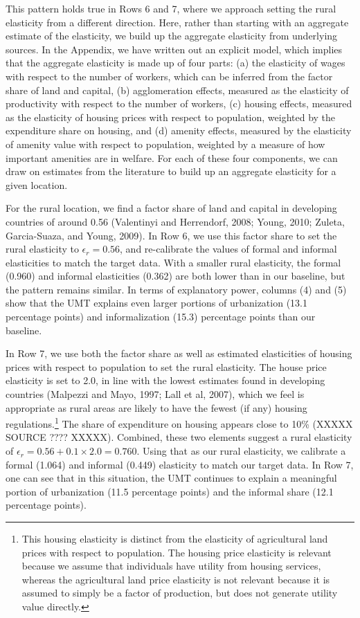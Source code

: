 \documentclass[10pt]{article}
\begin{document}
This pattern holds true in Rows 6 and 7, where we approach setting the rural elasticity from a different direction. Here, rather than starting with an aggregate estimate of the elasticity, we build up the aggregate elasticity from underlying sources. In the Appendix, we have written out an explicit model, which implies that the aggregate elasticity is made up of four parts: (a) the elasticity of wages with respect to the number of workers, which can be inferred from the factor share of land and capital, (b) agglomeration effects, measured as the elasticity of productivity with respect to the number of workers, (c) housing effects, measured as the elasticity of housing prices with respect to population, weighted by the expenditure share on housing, and (d) amenity effects, measured by the elasticity of amenity value with respect to population, weighted by a measure of how important amenities are in welfare. For each of these four components, we can draw on estimates from the literature to build up an aggregate elasticity for a given location.

For the rural location, we find a factor share of land and capital in developing countries of around 0.56 (Valentinyi and Herrendorf, 2008; Young, 2010; Zuleta, Garcia-Suaza, and Young, 2009). In Row 6, we use this factor share to set the rural elasticity to $\epsilon_r = 0.56$, and re-calibrate the values of formal and informal elasticities to match the target data. With a smaller rural elasticity, the formal (0.960) and informal elasticities (0.362) are both lower than in our baseline, but the pattern remains similar. In terms of explanatory power, columns (4) and (5) show that the UMT explains even larger portions of urbanization (13.1 percentage points) and informalization (15.3) percentage points than our baseline. 

In Row 7, we use both the factor share as well as estimated elasticities of housing prices with respect to population to set the rural elasticity. The house price elasticity is set to 2.0, in line with the lowest estimates found in developing countries (Malpezzi and Mayo, 1997; Lall et al, 2007), which we feel is appropriate as rural areas are likely to have the fewest (if any) housing regulations.\footnote{This housing elasticity is distinct from the elasticity of agricultural land prices with respect to population. The housing price elasticity is relevant because we assume that individuals have utility from housing services, whereas the agricultural land price elasticity is not relevant because it is assumed to simply be a factor of production, but does not generate utility value directly.} The share of expenditure on housing appears close to 10\% (XXXXX SOURCE ???? XXXXX). Combined, these two elements suggest a rural elasticity of $\epsilon_r = 0.56 + 0.1\times2.0 = 0.760$. Using that as our rural elasticity, we calibrate  a formal (1.064) and informal (0.449) elasticity to match our target data. In Row 7, one can see that in this situation, the UMT continues to explain a meaningful portion of urbanization (11.5 percentage points) and the informal share (12.1 percentage points). 
\end{document}
